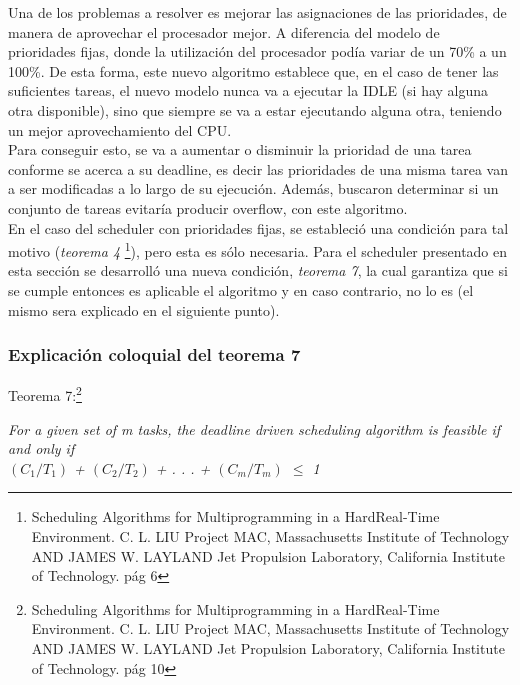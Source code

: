 \documentclass[a4paper]{article}
\begin{document}
Una de los problemas a resolver es mejorar las asignaciones de las prioridades, de manera de aprovechar el procesador mejor. A diferencia del modelo de prioridades fijas, donde la utilización del procesador podía variar de un 70\% a un 100\%. De esta forma, este nuevo algoritmo establece que, en el caso de tener las suficientes tareas, el nuevo modelo nunca va a ejecutar la IDLE (si hay alguna otra disponible), sino que siempre se va a estar ejecutando alguna otra, teniendo un mejor aprovechamiento del CPU. \\

 Para conseguir esto, se va a aumentar o disminuir la prioridad de una tarea conforme se acerca a su deadline, es decir las prioridades de una misma tarea van a ser modificadas a lo largo de su ejecución. Además, buscaron determinar si un conjunto de tareas evitar\'ia producir overflow, con este algoritmo.\\
 
  En el caso del scheduler con prioridades fijas, se estableció una condición para tal motivo (\textit{teorema 4} \footnote{Scheduling Algorithms for Multiprogramming in a HardReal-Time Environment.
C. L. LIU Project MAC, Massachusetts Institute of Technology AND JAMES W. LAYLAND Jet Propulsion Laboratory, California Institute of Technology. pág 6}), pero esta es s\'olo necesaria. Para el scheduler presentado en esta sección se desarroll\'o una nueva condición, \textit{teorema 7}, la cual garantiza que si se cumple entonces es aplicable el algoritmo y en caso contrario, no lo es (el mismo sera explicado en el siguiente punto). \\
  
 \newpage
\subsubsection{Explicaci\'on coloquial del teorema 7}

Teorema 7:\footnote{Scheduling Algorithms for Multiprogramming in a HardReal-Time Environment.
C. L. LIU Project MAC, Massachusetts Institute of Technology AND JAMES W. LAYLAND Jet Propulsion Laboratory, California Institute of Technology. pág 10}

\textit {For a given set of m tasks, the deadline driven scheduling algorithm
is feasible if and only if }\\
 
 \textit {$(C_1/T_1)$ + $(C_2/T_2)$ + . . . + $(C_m/T_m)$ $\leq$ 1 } \\
\end{document}
